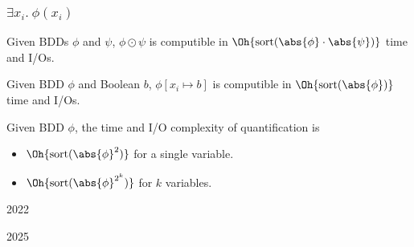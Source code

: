 \documentclass[english, aspectratio=169]{beamer}
\newcommand{\sort}[1]{\text{sort}(#1)}
\begin{document}
\begin{frame}
  \frametitle{$\exists x_i .\ \phi(x_i)$}

  \begin{theorem}
    Given BDDs $\phi$ and $\psi$, $\phi \odot \psi$ is computible in
    $\Oh{\sort{\abs{\phi} \cdot \abs{\psi}}}$ time and I/Os.
  \end{theorem}

  \medskip

  \begin{theorem}[S{\o}lvsten et al.~'22]
    Given BDD $\phi$ and Boolean $b$, $\phi[x_i \mapsto b]$ is computible in
    $\Oh{\sort{\abs{\phi}}}$ time and I/Os.
  \end{theorem}

  \medskip\pause

  \begin{corollary}[S{\o}lvsten et al.~'22]
    Given BDD $\phi$, the time and I/O complexity of quantification is
    \vspace{-8pt}
    \begin{itemize}
    \item $\Oh{\sort{\abs{\phi}^2}}$ for a single variable.
    \item $\Oh{\sort{\abs{\phi}^{2^k}}}$ for $k$ variables.
    \end{itemize}
  \end{corollary}
\end{frame}

\begin{frame}

  \begin{center}
    \bf
    {\fontsize{42}{50}\selectfont {}}

    \vspace{10pt}

    {\Huge 2022}
  \end{center}
\end{frame}



\begin{frame}

  \begin{center}
    \bf
    {\fontsize{42}{50}\selectfont {}}

    \vspace{10pt}

    {\Huge 2025}
  \end{center}
\end{frame}
\end{document}
